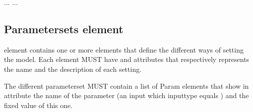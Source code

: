 \documentclass[letterpaper,13pt,english]{sphinxmanual}
\begin{document}
%
\begin{sphinxVerbatim}[commandchars=\\\{\}]
    
   ...
    \PYG{c+cp}{\PYGZlt{}![CDATA[}
\PYG{c+cp}{      ]]\PYGZgt{}}
   ...
\end{sphinxVerbatim}


\subsection{Parametersets element}
\label{\detokenize{user/description:parametersets-element}}
\begin{DUlineblock}{0em}
\item[]  element contains one or more  elements that define the different ways of setting the model.
Each  element MUST have  and  attributes that respectively represents the name and the description of each setting.
\end{DUlineblock}

\begin{DUlineblock}{0em}
\item[] The different parameterset MUST contain a list of Param elements that show in attribute the name of the parameter (an input
which inputtype equals ) and the fixed value of this one.
\end{DUlineblock}
\end{document}
